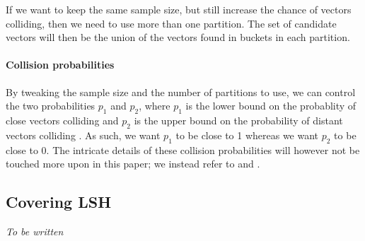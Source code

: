 If we want to keep the same sample size, but still increase the chance of vectors colliding, then we need to use more than one partition. The set of candidate vectors will then be the union of the vectors found in buckets in each partition.

\paragraph{Collision probabilities} By tweaking the sample size and the number of partitions to use, we can control the two probabilities $p_1$ and $p_2$, where $p_1$ is the lower bound on the probablity of close vectors colliding and $p_2$ is the upper bound on the probability of distant vectors colliding \cite[p. 100]{DBLP:books/cu/LeskovecRU14}. As such, we want $p_1$ to be close to 1 whereas we want $p_2$ to be close to 0. The intricate details of these collision probabilities will however not be touched more upon in this paper; we instead refer to \cite{DBLP:conf/stoc/IndykM98} and \cite{DBLP:books/cu/LeskovecRU14}.

\subsection{Covering LSH}
\label{background-covering-lsh}

\textit{To be written}
